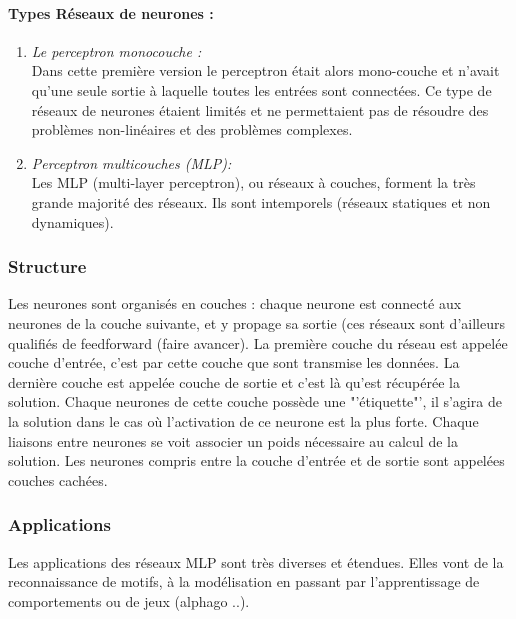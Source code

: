 \documentclass{article}
\begin{document}
			\paragraph{Types Réseaux de neurones :}
				\begin{enumerate}
					\item \emph{Le perceptron monocouche :} \\Dans cette première version le perceptron était alors mono-couche et n'avait qu'une seule sortie à laquelle toutes les entrées sont connectées. Ce type de réseaux de neurones étaient limités et ne permettaient pas de résoudre des problèmes non-linéaires et des problèmes complexes.
					\item \emph{Perceptron multicouches (MLP):} \\Les MLP (multi-layer perceptron), ou réseaux à couches, forment la très grande majorité des réseaux. Ils sont intemporels (réseaux statiques et non dynamiques).
				\end{enumerate}
		\subsubsection{Structure}
			Les neurones sont organisés en couches : chaque neurone est connecté aux neurones de la couche suivante, et y propage sa sortie (ces réseaux sont d'ailleurs qualifiés de feedforward (faire avancer). La première couche du réseau est appelée couche d'entrée, c'est par cette couche que sont transmise les données. La dernière couche est appelée couche de sortie et c'est là qu'est récupérée la solution. Chaque neurones de cette couche possède une "'étiquette"', il s'agira de la solution dans le cas où l'activation de ce neurone est la plus forte. Chaque liaisons entre neurones se voit associer un poids nécessaire au calcul de la solution. Les neurones compris entre la couche d'entrée et de sortie sont appelées couches cachées.
		\subsubsection{Applications}
			Les applications des réseaux MLP sont très diverses et étendues. Elles vont de la reconnaissance de motifs, à la modélisation en passant par l'apprentissage de comportements ou de jeux (alphago ..).
\end{document}

